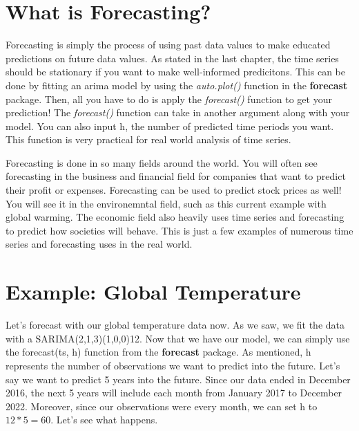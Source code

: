 \documentclass[
]{book}
\begin{document}
\hypertarget{what-is-forecasting}{%
\section{What is Forecasting?}\label{what-is-forecasting}}

Forecasting is simply the process of using past data values to make educated predictions on future data values. As stated in the last chapter, the time series should be stationary if you want to make well-informed predicitons. This can be done by fitting an arima model by using the \emph{auto.plot()} function in the \textbf{forecast} package. Then, all you have to do is apply the \emph{forecast()} function to get your prediction! The \emph{forecast()} function can take in another argument along with your model. You can also input h, the number of predicted time periods you want. This function is very practical for real world analysis of time series.

Forecasting is done in so many fields around the world. You will often see forecasting in the business and financial field for companies that want to predict their profit or expenses. Forecasting can be used to predict stock prices as well! You will see it in the environemntal field, such as this current example with global warming. The economic field also heavily uses time series and forecasting to predict how societies will behave. This is just a few examples of numerous time series and forecasting uses in the real world.

\hypertarget{example-global-temperature}{%
\section{Example: Global Temperature}\label{example-global-temperature}}

Let's forecast with our global temperature data now. As we saw, we fit the data with a SARIMA(2,1,3)(1,0,0)12. Now that we have our model, we can simply use the forecast(ts, h) function from the \textbf{forecast} package. As mentioned, h represents the number of observations we want to predict into the future. Let's say we want to predict 5 years into the future. Since our data ended in December 2016, the next 5 years will include each month from January 2017 to December 2022. Moreover, since our observations were every month, we can set h to \(12 * 5 = 60\). Let's see what happens.
\end{document}

